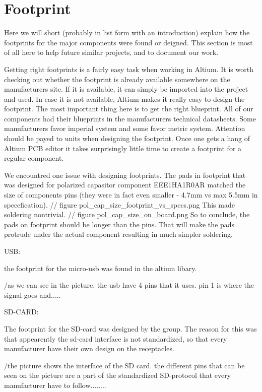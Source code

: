 \section {Footprint}

Here we will short (probably in list form with an introduction) explain how the footprints for the major components were found or deigned.
This section is most of all here to help future similar projects, and to document our work.

Getting right footprints is a fairly easy task when working in Altium.
It is worth checking out whether the footprint is already available somewhere on the manufacturers site.
If it is available, it can simply be imported into the project and used.
In case it is not available, Altium makes it really easy to design the footprint.
The most important thing here is to get the right blueprint.
All of our components had their blueprints in the manufacturers technical datasheets.
Some manufacturers favor imperial system and some favor metric system.
Attention should be payed to units when designing the footprint.
Once one gets a hang of Altium PCB editor it takes surprisingly little time to create a footprint for a regular component.

We encountred one issue with designing footprints.
The pads in footprint that was designed for polarized capasitor component EEE1HA1R0AR matched the size of components pins (they were in fact even smaller - 4.7mm vs max 5.5mm in specefication). 
// figure pol_cap_size_footprint_vs_specs.png
This made soldering nontrivial.
// figure pol_cap_size_on_board.png
So to conclude, the pads on footprint should be longer than the pins.
That will make the pads protrude under the actual component resulting in much simpler soldering.

USB:

the footprint for the micro-usb was found in the altium libary. 


/as we can see in the picture, the usb have 4 pins that it uses. pin 1 is where the signal goes and.....

SD-CARD:

The footprint for the SD-card was designed by the group. The reason for this was that appearently the sd-card interface is not standardized, so that 
every manufacturer have their own design on the receptacles. 


/the picture shows the interface of the SD card. the different pins that can be seen on the picture are a part of the standardized SD-protocol that 
every manufacturer have to follow........

